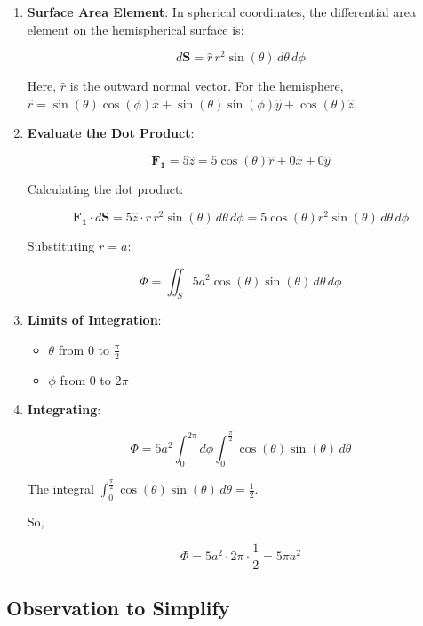 \documentclass[a4paper,12pt]{article}
\begin{document}
\begin{enumerate}
    \item \textbf{Surface Area Element}: In spherical coordinates, the differential area element on the hemispherical surface is:

    \[
    d\mathbf{S} = \hat{r} \, r^2 \sin(\theta) \, d\theta \, d\phi
    \]

    Here, \( \hat{r} \) is the outward normal vector. For the hemisphere, \( \hat{r} = \sin(\theta) \cos(\phi) \hat{x} + \sin(\theta) \sin(\phi) \hat{y} + \cos(\theta) \hat{z} \).

    \item \textbf{Evaluate the Dot Product}:

    \[
    \mathbf{F_1} = 5 \hat{z} = 5 \cos(\theta) \hat{r} + 0 \hat{x} + 0 \hat{y}
    \]

    Calculating the dot product:

    \[
    \mathbf{F_1} \cdot d\mathbf{S} = 5 \hat{z} \cdot \hat{r} \, r^2 \sin(\theta) \, d\theta \, d\phi = 5 \cos(\theta) r^2 \sin(\theta) \, d\theta \, d\phi
    \]

    Substituting \( r = a \):

    \[
    \Phi = \iint_S 5 a^2 \cos(\theta) \sin(\theta) \, d\theta \, d\phi
    \]

    \item \textbf{Limits of Integration}:
    \begin{itemize}
        \item \( \theta \) from 0 to \( \frac{\pi}{2} \)
        \item \( \phi \) from 0 to \( 2\pi \)
    \end{itemize}

    \item \textbf{Integrating}:

    \[
    \Phi = 5a^2 \int_0^{2\pi} d\phi \int_0^{\frac{\pi}{2}} \cos(\theta) \sin(\theta) \, d\theta
    \]

    The integral \( \int_0^{\frac{\pi}{2}} \cos(\theta) \sin(\theta) \, d\theta = \frac{1}{2} \).

    So,

    \[
    \Phi = 5a^2 \cdot 2\pi \cdot \frac{1}{2} = 5\pi a^2
    \]
\end{enumerate}

\subsection{Observation to Simplify}
\end{document}
